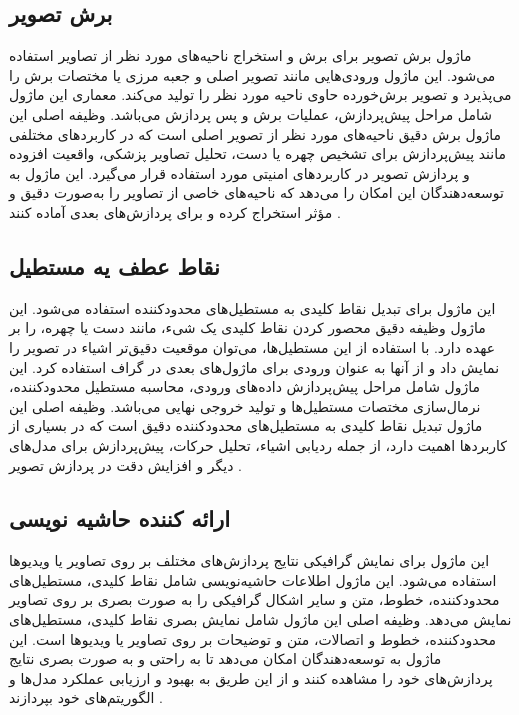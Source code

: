 \subsection{برش تصویر \protect{}}
ماژول برش تصویر برای برش و استخراج ناحیه‌های مورد نظر از تصاویر استفاده می‌شود. این ماژول ورودی‌هایی مانند تصویر اصلی و جعبه مرزی یا مختصات برش را می‌پذیرد و تصویر برش‌خورده حاوی ناحیه مورد 
نظر را تولید می‌کند. معماری این ماژول شامل مراحل پیش‌پردازش، عملیات برش  و پس‌ پردازش  می‌باشد. وظیفه اصلی این ماژول برش دقیق ناحیه‌های مورد نظر از تصویر اصلی است که در کاربردهای 
مختلفی مانند پیش‌پردازش برای تشخیص چهره یا دست، تحلیل تصاویر پزشکی، واقعیت افزوده و پردازش تصویر در کاربردهای امنیتی مورد استفاده قرار می‌گیرد. این ماژول به 
توسعه‌دهندگان این امکان را می‌دهد که ناحیه‌های خاصی از تصاویر را به‌صورت دقیق و مؤثر استخراج کرده و برای پردازش‌های بعدی آماده کنند \cite{zhang2020mediapipe}.


\subsection{نقاط عطف یه مستطیل\protect{}}
این ماژول برای تبدیل نقاط کلیدی به مستطیل‌های محدودکننده استفاده می‌شود. این ماژول وظیفه دقیق محصور کردن نقاط کلیدی یک شیء، مانند دست یا چهره، را بر عهده دارد. با استفاده از این مستطیل‌ها، می‌توان موقعیت دقیق‌تر اشیاء در 
تصویر را نمایش داد و از آنها به عنوان ورودی برای ماژول‌های بعدی در گراف استفاده کرد. این ماژول شامل مراحل پیش‌پردازش داده‌های ورودی، محاسبه مستطیل محدودکننده، نرمال‌سازی مختصات مستطیل‌ها و تولید خروجی نهایی 
می‌باشد. وظیفه اصلی این ماژول تبدیل نقاط کلیدی به مستطیل‌های محدودکننده دقیق است که در بسیاری از کاربردها اهمیت دارد، از جمله ردیابی اشیاء، تحلیل حرکات، پیش‌پردازش برای مدل‌های دیگر و افزایش دقت در پردازش تصویر \cite{zhang2020mediapipe}.


\subsection{ارائه کننده حاشیه نویسی\protect{}}
این ماژول برای نمایش گرافیکی نتایج پردازش‌های مختلف بر روی تصاویر یا ویدیوها استفاده می‌شود. این ماژول اطلاعات حاشیه‌نویسی شامل نقاط کلیدی، مستطیل‌های محدودکننده، خطوط، متن و سایر اشکال گرافیکی را به صورت 
بصری بر روی تصاویر نمایش می‌دهد. وظیفه اصلی این ماژول شامل نمایش بصری نقاط کلیدی، مستطیل‌های محدودکننده، خطوط و اتصالات، متن و توضیحات بر روی تصاویر یا ویدیوها است. این ماژول به توسعه‌دهندگان امکان 
می‌دهد تا به راحتی و به صورت بصری نتایج پردازش‌های خود را مشاهده کنند و از این طریق به بهبود و ارزیابی عملکرد مدل‌ها و الگوریتم‌های خود بپردازند \cite{zhang2020mediapipe}.


